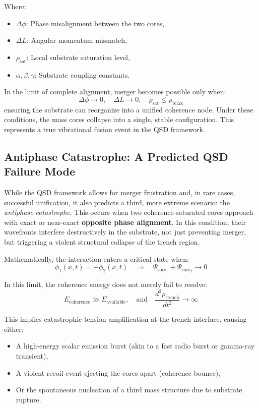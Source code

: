 \documentclass[sn-mathphys]{sn-jnl}
\theoremstyle{thmstyleone}%
\theoremstyle{thmstyletwo}%
\theoremstyle{thmstylethree}%
\begin{document}
Where:
\begin{itemize}
    \item \( \Delta \phi \): Phase misalignment between the two cores,
    \item \( \Delta L \): Angular momentum mismatch,
    \item \( \rho_{\text{sat}} \): Local substrate saturation level,
    \item \( \alpha, \beta, \gamma \): Substrate coupling constants.
\end{itemize}

In the limit of complete alignment, merger becomes possible only when:
\[
\Delta \phi \to 0, \quad \Delta L \to 0, \quad \rho_{\text{sat}} \leq \rho_{\text{relax}}
\]
ensuring the substrate can reorganize into a unified coherence node. Under these conditions, the mass cores collapse into a single, stable configuration. This represents a true vibrational fusion event in the QSD framework.

\subsection{Antiphase Catastrophe: A Predicted QSD Failure Mode}

While the QSD framework allows for merger frustration and, in rare cases, successful unification, it also predicts a third, more extreme scenario: the \textit{antiphase catastrophe}. This occurs when two coherence-saturated cores approach with exact or near-exact \textbf{opposite phase alignment}. In this condition, their wavefronts interfere destructively in the substrate, not just preventing merger, but triggering a violent structural collapse of the trench region.

Mathematically, the interaction enters a critical state when:
\[
\phi_1(x,t) = -\phi_2(x,t) \quad \Rightarrow \quad \Psi_{\text{core}_1} + \Psi_{\text{core}_2} \to 0
\]

In this limit, the coherence energy does not merely fail to resolve:
\[
E_{\text{coherence}} \gg E_{\text{available}}, \quad \text{and} \quad \frac{d^2 \rho_{\text{trench}}}{dt^2} \to \infty
\]

This implies catastrophic tension amplification at the trench interface, causing either:
\begin{itemize}
    \item A high-energy scalar emission burst (akin to a fast radio burst or gamma-ray transient),
    \item A violent recoil event ejecting the cores apart (coherence bounce),
    \item Or the spontaneous nucleation of a third mass structure due to substrate rupture.
\end{itemize}
\end{document}
